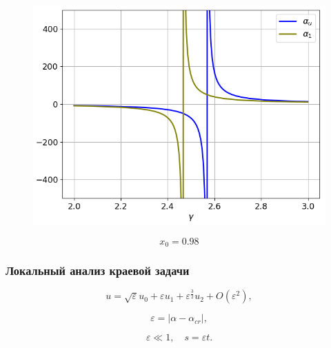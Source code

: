 \documentclass[fullscreen=true, unicode, bookmarks=false]{beamer}
\begin{document}
\begin{frame}

\begin{figure} 
\includegraphics[scale=0.65]{comparison_au_a1_3.png}  
\end{figure}

$$ x_0 = 0.98 $$

\end{frame}

\begin{frame}
\frametitle{ Локальный анализ краевой задачи }

\begin{equation}
	u = \sqrt{\varepsilon}u_0 + \varepsilon u_1 + \varepsilon^{\frac{3}{2}} u_2 + O(\varepsilon^2),
\end{equation}

\bigskip

$$ \varepsilon = | \alpha - \alpha_{cr} |, $$

$$ \varepsilon \ll 1, \quad s = \varepsilon t. $$

\end{frame}
\end{document}
